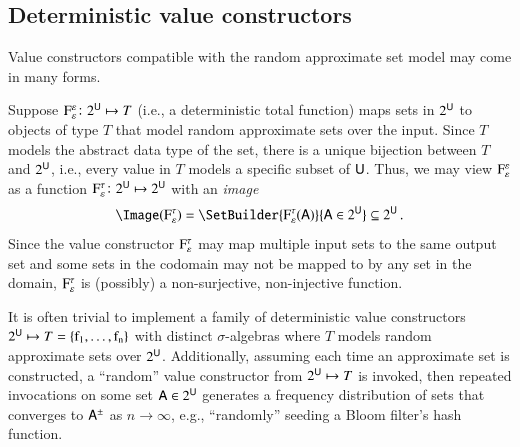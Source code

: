 \documentclass[10pt,final,hidelinks]{article}
\numberwithin{equation}{section}
\newcommand{\EmptySet}{\varnothing}
\newcommand{\PS}[1]{2^{#1}}
\newcommand{\tprate}{\tau}
\newcommand{\fprate}{\varepsilon}
\theoremstyle{plain}
\newenvironment{remark}
  {\pushQED{\qed}\renewcommand{\qedsymbol}{$\triangle$}\remarkx}
  {\popQED\endremarkx}
\begin{document}
\subsection{Deterministic value constructors}
Value constructors compatible with the random approximate set model may come in many forms.


Suppose $\ctor{\fprate}{\fprate} \colon \PS{\Set{U}} \mapsto T$ (i.e., a deterministic total function) maps sets in $\PS{\Set{U}}$ to objects of type $T$ that model random approximate sets over the input.
Since $T$ models the abstract data type of the set, there is a unique bijection between $T$ and $\PS{\Set{{U}}}$, i.e., every value in $T$ models a specific subset of $\Set{U}$.
Thus, we may view $\ctor{\fprate}{\fprate}$ as a function $\ctor{\fprate}{\tprate} \colon \PS{\Set{U}} \mapsto \PS{\Set{U}}$ with an \emph{image}
\begin{equation}
\Image(\ctor{\fprate}{\tprate}) = \SetBuilder{\ctor{\fprate}{\tprate}(\Set{A})}{\Set{A} \in \PS{\Set{U}}} \subseteq \PS{\Set{U}}\,.
\end{equation}
Since the value constructor $\ctor{\fprate}{\tprate}$ may map multiple input sets to the same output set and some sets in the codomain may not be mapped to by any set in the domain, $\ctor{\fprate}{\tprate}$ is (possibly) a non-surjective, non-injective function.


\begin{remark}
It is often trivial to implement a family of deterministic value constructors $\PS{\Set{U}} \mapsto T = \{\operatorname{f_1},\ldots,\operatorname{f_n}\}$ with distinct $\sigma$-algebras where $T$ models random approximate sets over $\PS{\Set{U}}$.
Additionally, assuming each time an approximate set is constructed, a ``random'' value constructor from $\PS{\Set{U}} \mapsto T$ is invoked, then repeated invocations on some set $\Set{A} \in \PS{\Set{U}}$ generates a frequency distribution of sets that converges to $\ASet{A}$ as $n \to \infty$, e.g., ``randomly'' seeding a Bloom filter's hash function.
\end{remark}
\end{document}

